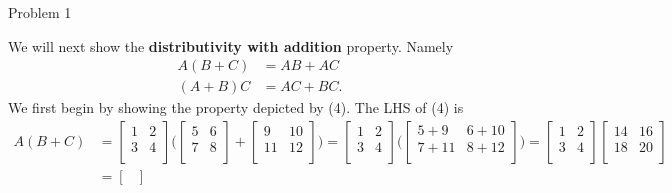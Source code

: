 \begin{problem}{Problem 1}
\begin{Highlight}[Solution]
        We will next show the \textbf{distributivity with addition} property. Namely
        \begin{align}
            A(B + C) & = AB + AC \\
            (A + B)C & = AC + BC.
        \end{align}
        We first begin by showing the property depicted by (4). The LHS of (4) is
        \begin{align*}
            A(B + C) & = 
            \begin{bmatrix}
                1 & 2 \\
                3 & 4 \\
            \end{bmatrix}
            \Bigg(
                \begin{bmatrix}
                    5 & 6 \\
                    7 & 8 \\
                \end{bmatrix}
                + 
                \begin{bmatrix}
                    9 & 10 \\
                    11 & 12 \\
                \end{bmatrix}
            \Bigg)
            = 
            \begin{bmatrix}
                1 & 2 \\
                3 & 4 \\
            \end{bmatrix}
            \Bigg(
                \begin{bmatrix}
                    5 + 9 & 6 + 10 \\
                    7 + 11 & 8 + 12 \\
                \end{bmatrix}
            \Bigg)
            = 
            \begin{bmatrix}
                1 & 2 \\
                3 & 4 \\
            \end{bmatrix}
            \begin{bmatrix}
                14 & 16 \\
                18 & 20 \\
            \end{bmatrix} \\
            & = 
            \begin{bmatrix}

\end{bmatrix}
\end{align*}
\end{Highlight}
\end{problem}
